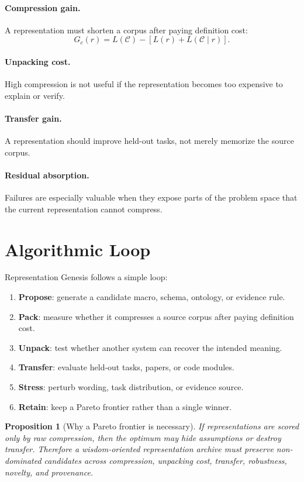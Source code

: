 \documentclass[11pt]{article}
\newtheorem{proposition}{Proposition}
\begin{document}
\paragraph{Compression gain.}
A representation must shorten a corpus after paying definition cost:
\[
G_c(r)=L(\mathcal{C})-[L(r)+L(\mathcal{C}\mid r)].
\]

\paragraph{Unpacking cost.}
High compression is not useful if the representation becomes too expensive to explain or verify.

\paragraph{Transfer gain.}
A representation should improve held-out tasks, not merely memorize the source corpus.

\paragraph{Residual absorption.}
Failures are especially valuable when they expose parts of the problem space that the current representation cannot compress.

\section{Algorithmic Loop}

Representation Genesis follows a simple loop:
\begin{enumerate}[leftmargin=*]
  \item \textbf{Propose}: generate a candidate macro, schema, ontology, or evidence rule.
  \item \textbf{Pack}: measure whether it compresses a source corpus after paying definition cost.
  \item \textbf{Unpack}: test whether another system can recover the intended meaning.
  \item \textbf{Transfer}: evaluate held-out tasks, papers, or code modules.
  \item \textbf{Stress}: perturb wording, task distribution, or evidence source.
  \item \textbf{Retain}: keep a Pareto frontier rather than a single winner.
\end{enumerate}

\begin{proposition}[Why a Pareto frontier is necessary]
If representations are scored only by raw compression, then the optimum may hide assumptions or destroy transfer.
Therefore a wisdom-oriented representation archive must preserve non-dominated candidates across compression, unpacking cost, transfer, robustness, novelty, and provenance.
\end{proposition}
\end{document}

